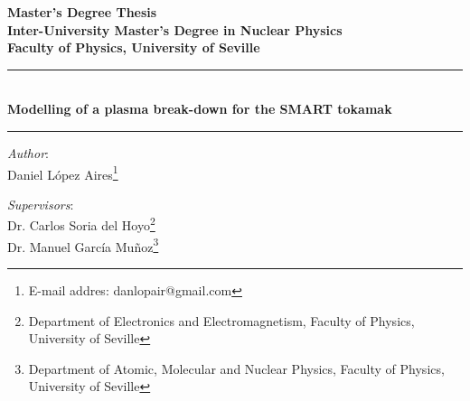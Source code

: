 \documentclass[a4paper,12pt,oneside]{book}
\begin{document}
\thispagestyle{empty}




\begin{large}
\textbf{Master's Degree Thesis \\
Inter-University Master's Degree in Nuclear Physics \\
Faculty of Physics, University of Seville}
\end{large}

\vspace{2cm}

\begin{center}

\rule{\textwidth}{0.1mm} 
\\
\textbf{\huge Modelling of a plasma break-down for the SMART tokamak} \\
\rule{\textwidth}{0.1mm}
%
\vspace{.5cm}

\begin{flushleft}
\textit{Author}: \\
Daniel López Aires\footnote{E-mail addres: danlopair@gmail.com}
\end{flushleft} 
\hfill 
\begin{flushright}
\textit{Supervisors}: \\
Dr. Carlos Soria del Hoyo\footnote{Department of Electronics and Electromagnetism, Faculty of Physics, University of Seville} \\
Dr. Manuel García Muñoz\footnote{Department of Atomic, Molecular and Nuclear Physics, Faculty of Physics, University of Seville}\\
\end{flushright}






\end{center}
\end{document}

